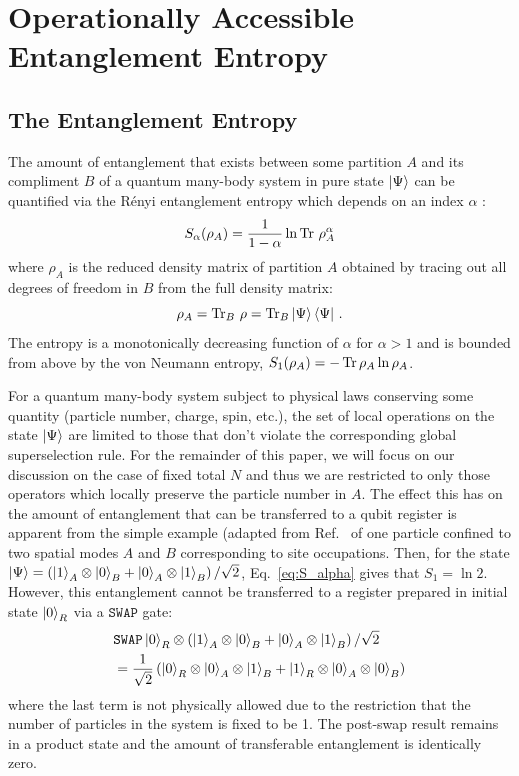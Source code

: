 \section{Operationally Accessible Entanglement Entropy}

\subsection{The \ren Entanglement Entropy}
\label{sec:accEntanglementIntro}

The amount of entanglement that exists between some partition $A$ and its compliment $B$ of a quantum many-body system in pure state $\ket{\Psi}$ can be quantified via the R\'{e}nyi entanglement entropy which depends on an index $\alpha$ :
%
\begin{equation}
S_{\alpha} (\rho_A) = \frac{1}{1-\alpha}\ln \operatorname{Tr}\, \rho_A^{\alpha}
\label{eq:S_alpha}
\end{equation}
%
where $\rho_{A}$ is the reduced density matrix of partition $A$ obtained by
tracing out all degrees of freedom in $B$ from the full density matrix:
%
\begin{equation}
\rho_{A} = \operatorname{Tr}_{B}\, \rho = \operatorname{Tr}_{B} \ket{\Psi}\bra{\Psi}\,.
\end{equation}
%
The \ren entropy is a monotonically decreasing function of $\alpha$ for $\alpha
> 1$ and is bounded from above by the von Neumann entropy, $S_1(\rho_A) = -\operatorname{Tr} \rho_A \ln \rho_A$.

For a quantum many-body system subject to physical laws conserving some quantity (particle number, charge, spin, etc.), the set of local operations on the state $\ket{\Psi}$ are limited to those that don't violate the corresponding global superselection rule.  For the remainder of this paper, we will focus on our discussion on the case of fixed total $N$ and thus we are restricted to only those operators which locally preserve the particle number in $A$.  The effect this has on the amount of entanglement that can be transferred to a qubit register is apparent from the simple example (adapted from Ref.~\cite{Wiseman:2003vn} of one particle confined to two spatial modes $A$ and $B$ corresponding to site occupations.  Then, for the state $\ket{\Psi} = \left(\ket{1}_A \otimes \ket{0}_{B} + \ket{0}_A \otimes \ket{1}_{B} \right)/\sqrt{2}$, Eq.~\eqref{eq:S_alpha} gives that $S_1 = \ln 2$. However, this entanglement cannot be transferred to a register prepared in initial state $\ket{0}_R$ via a $\texttt{SWAP}$ gate:
\begin{align*}
    & \texttt{SWAP} \ket{0}_R\otimes\left(\ket{1}_A \otimes
    \ket{0}_{B} + \ket{0}_A \otimes \ket{1}_{B} \right)/\sqrt{2} \\
    &= \frac{1}{\sqrt{2}}\left( \ket{0}_R \otimes \ket{0}_A \otimes
        \ket{1}_{B} + \ket{1}_R \otimes \ket{0}_A \otimes
    \ket{0}_{B} \right)
\end{align*}
where the last term is not physically allowed due to the restriction that the number of particles in the system is fixed to be 1. The post-swap result remains in a product state and the amount of transferable entanglement is identically zero.


